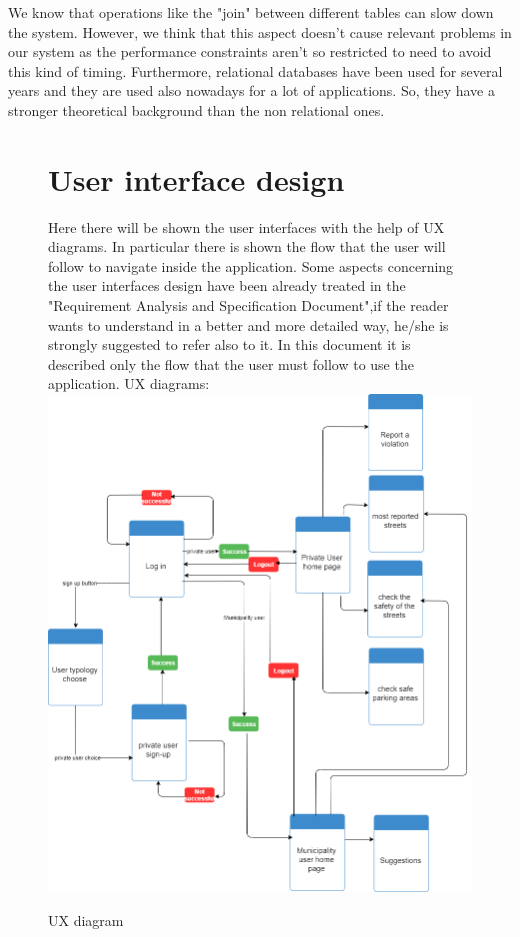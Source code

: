 \documentclass[titlepage]{article}
\begin{document}
\begin{itemize}
We know that operations like the "join" between different tables can slow down the system. However, we think that this aspect doesn't cause relevant problems in our system as the performance constraints aren't so restricted to need to avoid this kind of timing. Furthermore, relational databases have been used for several years and they are used also nowadays for a lot of applications. So, they have a stronger theoretical background than the non relational ones.
	
\end{itemize}

\begin{figure}[h]
	\section{User interface design}
Here there will be shown the user interfaces with the help of UX diagrams. In particular there is shown the flow that the user will follow to navigate inside the application. Some aspects concerning the user interfaces design have been already treated in the "Requirement Analysis and Specification Document",if the reader wants to understand in a better and more detailed way, he/she is strongly suggested to refer also to it. In this document it is described only the flow that the user must follow to use the application.
UX diagrams:\\
	\includegraphics[scale=0.48]{Diagrams/UX diagram.png}
	\caption{UX diagram}
\end{figure}
\FloatBarrier
\end{document}
